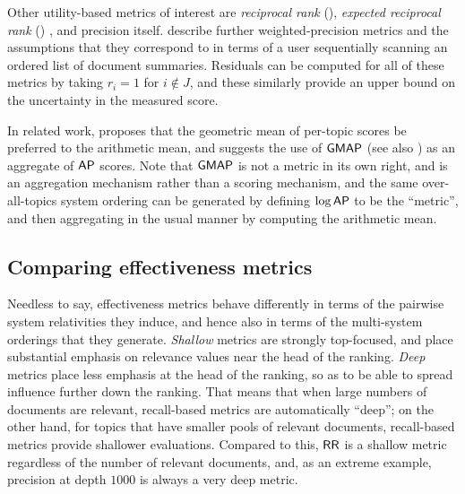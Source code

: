 Other utility-based metrics of interest are {\emph{reciprocal rank}}
(\rr), {\emph{expected reciprocal rank}} (\err) {\citep{cmzg09cikm}},
and precision itself.
{\citet{mbst17acmtois}} describe further weighted-precision metrics
and the assumptions that they correspond to in terms of a user
sequentially scanning an ordered list of document summaries.
Residuals can be computed for all of these metrics by taking $r_i=1$
for $i\not\in J$, and these similarly provide an upper bound on the
uncertainty in the measured score.

In related work, {\citet{robertson06cikm}} proposes that the
geometric mean of per-topic scores be preferred to the arithmetic
mean, and suggests the use of ${\mbox{\sf{GMAP}}}$ (see also {\citet{rm09adc}}) as
an aggregate of ${\mbox{\sf{AP}}}$ scores.
Note that ${\mbox{\sf{GMAP}}}$ is not a metric in its own right, and is an
aggregation mechanism rather than a scoring mechanism, and the same
over-all-topics system ordering can be generated by defining
$\log{\mbox{\sf{AP}}}$ to be the ``metric'', and then aggregating in the usual
manner by computing the arithmetic mean.


\subsection{Comparing effectiveness metrics}

Needless to say, effectiveness metrics behave differently in terms of
the pairwise system relativities they induce, and hence also in terms
of the multi-system orderings that they generate.
{\emph{Shallow}} metrics are strongly top-focused, and place
substantial emphasis on relevance values near the head of the
ranking.
{\emph{Deep}} metrics place less emphasis at the head of the ranking,
so as to be able to spread influence further down the ranking.
That means that when large numbers of documents are relevant,
recall-based metrics are automatically ``deep''; on the other hand,
for topics that have smaller pools of relevant documents,
recall-based metrics provide shallower evaluations.
Compared to this, ${\mbox{\sf{RR}}}$ is a shallow metric regardless of the number
of relevant documents, and, as an extreme example, precision at depth
$1000$ is always a very deep metric.

